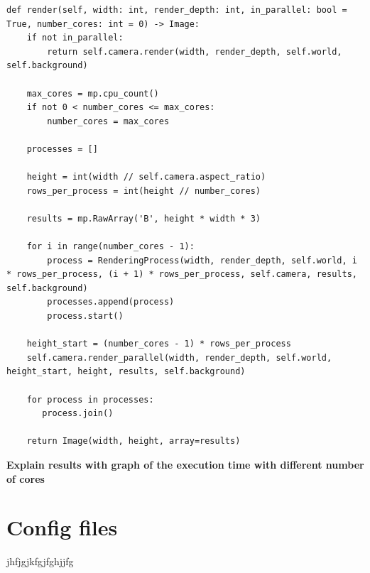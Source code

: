 \documentclass[12pt]{report}
\begin{document}
\newpage
\begin{lstlisting}[caption={Parallelizing the rendering process}, label=lst:parallel, style=mystyle]
def render(self, width: int, render_depth: int, in_parallel: bool = True, number_cores: int = 0) -> Image:
    if not in_parallel:
        return self.camera.render(width, render_depth, self.world, self.background)

    max_cores = mp.cpu_count()
    if not 0 < number_cores <= max_cores:
        number_cores = max_cores

    processes = []
    
    height = int(width // self.camera.aspect_ratio)
    rows_per_process = int(height // number_cores)
    
    results = mp.RawArray('B', height * width * 3)
    
    for i in range(number_cores - 1):
        process = RenderingProcess(width, render_depth, self.world, i * rows_per_process, (i + 1) * rows_per_process, self.camera, results, self.background)
        processes.append(process)
        process.start()

    height_start = (number_cores - 1) * rows_per_process
    self.camera.render_parallel(width, render_depth, self.world, height_start, height, results, self.background)
    
    for process in processes:
       process.join()

    return Image(width, height, array=results)
\end{lstlisting}
\newpage
\noindent \textbf{Explain results with graph of the execution time with different number of cores}

\chapter{Config files}
jhfjgjkfgjfghjjfg
\end{document}
